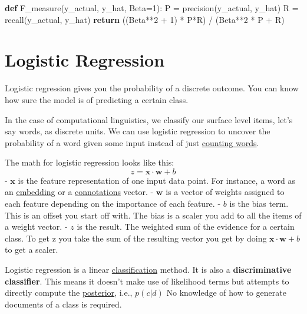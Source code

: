 \documentclass[
  11pt,
  british,
]{article}
\newenvironment{Shaded}{}{}
\newcommand{\ControlFlowTok}[1]{\textcolor[rgb]{0.00,0.44,0.13}{\textbf{#1}}}
\newcommand{\DecValTok}[1]{\textcolor[rgb]{0.25,0.63,0.44}{#1}}
\newcommand{\KeywordTok}[1]{\textcolor[rgb]{0.00,0.44,0.13}{\textbf{#1}}}
\newcommand{\NormalTok}[1]{#1}
\newcommand{\OperatorTok}[1]{\textcolor[rgb]{0.40,0.40,0.40}{#1}}
\begin{document}
\begin{Shaded}
\begin{Highlighting}[]
\KeywordTok{def}\NormalTok{ F\_measure(y\_actual, y\_hat, Beta}\OperatorTok{=}\DecValTok{1}\NormalTok{):}
\NormalTok{    P }\OperatorTok{=}\NormalTok{ precision(y\_actual, y\_hat)}
\NormalTok{    R }\OperatorTok{=}\NormalTok{ recall(y\_actual, y\_hat)}
    \ControlFlowTok{return}\NormalTok{ ((Beta}\OperatorTok{**}\DecValTok{2} \OperatorTok{+} \DecValTok{1}\NormalTok{) }\OperatorTok{*}\NormalTok{ P}\OperatorTok{*}\NormalTok{R) }\OperatorTok{/}\NormalTok{ (Beta}\OperatorTok{**}\DecValTok{2} \OperatorTok{*}\NormalTok{ P }\OperatorTok{+}\NormalTok{ R)}
\end{Highlighting}
\end{Shaded}

\hypertarget{logistic-regression}{%
\section{Logistic Regression}\label{logistic-regression}}

Logistic regression gives you the probability of a discrete outcome. You
can know how sure the model is of predicting a certain class.

In the case of computational linguistics, we classify our surface level
items, let's say words, as discrete units. We can use logistic
regression to uncover the probability of a word given some input instead
of just \href{../Semantic-Similarity/Co-occurrence.md}{counting words}.

The math for logistic regression looks like this:
\[z = \mathbf{x} \cdot \mathbf{w} + b\] - \(\mathbf{x}\) is the feature
representation of one input data point. For instance, a word as an
\href{Embeddings.md}{embedding} or a
\href{Connotations.md}{connotations} vector. - \(\mathbf{w}\) is a
vector of weights assigned to each feature depending on the importance
of each feature. - \(b\) is the bias term. This is an offset you start
off with. The bias is a scaler you add to all the items of a weight
vector. - \(z\) is the result. The weighted sum of the evidence for a
certain class. To get z you take the sum of the resulting vector you get
by doing \(\mathbf{x} \cdot \mathbf{w} + b\) to get a scaler.

Logistic regression is a linear
\href{../Classification.md}{classification} method. It is also a
\textbf{discriminative classifier}. This means it doesn't make use of
likelihood terms but attempts to directly compute the
\href{../Classification/Native\%20baiyes/Bayes\%20rule.md}{posterior},
i.e., \(p(c|d)\) No knowledge of how to generate documents of a class is
required.
\end{document}
